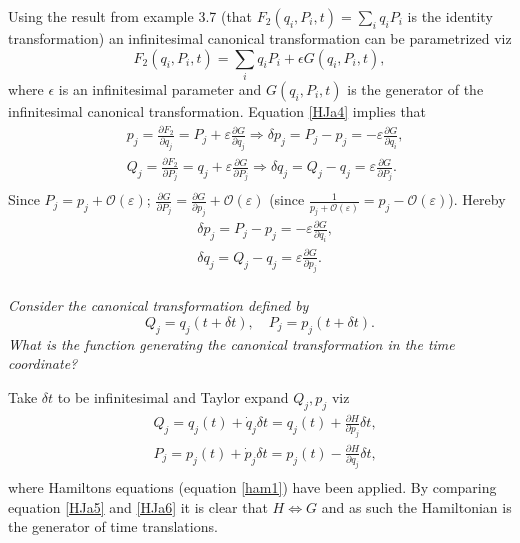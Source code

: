 Using the result from example 3.7 (that $F_2(q_i,P_i,t)=\sum_iq_iP_i$ is the identity transformation) an infinitesimal canonical transformation can be parametrized viz
\begin{equation}
	F_2(q_i,P_i,t)=\sum_iq_iP_i+\epsilon G(q_i,P_i,t),
	\label{HJa4}
\end{equation} 
where $\epsilon$ is an infinitesimal parameter and $G(q_i,P_i,t)$ is the generator of the infinitesimal canonical transformation. Equation \eqref{HJa4} implies that
\begin{equation}
	\begin{split}
		&p_j=\frac{\partial F_2}{\partial q_j}=P_j+\varepsilon \frac{\partial G}{\partial q_j}\Rightarrow \delta p_j=P_j-p_j=-\varepsilon \frac{\partial G}{\partial q_i},\\
		& Q_j=\frac{\partial F_2}{\partial P_j}=q_j+\varepsilon \frac{\partial G}{\partial P_j}\Rightarrow \delta q_j=Q_j-q_j=\varepsilon \frac{\partial G}{\partial P_j}.\\
	\end{split}
\end{equation} 
Since $P_j=p_j+\mathcal{O}(\varepsilon)$; $\frac{\partial G}{\partial P_j}=\frac{\partial G}{\partial p_j}+\mathcal{O}(\varepsilon)$ (since $\frac{1}{p_j+\mathcal{O}(\varepsilon)}=p_j-\mathcal{O}(\varepsilon)$). Hereby
\begin{equation}
	\begin{split}
		&\delta p_j=P_j-p_j=-\varepsilon \frac{\partial G}{\partial q_i},\\
		&\delta q_j=Q_j-q_j=\varepsilon \frac{\partial G}{\partial p_j}.\\
	\end{split}
	\label{HJa6}
\end{equation} 
\begin{example}
	\emph{Consider the canonical transformation defined by}
	\begin{equation}
		Q_j=q_j(t+\delta t), \quad P_j=p_j(t+\delta t).
	\end{equation} 
	\emph{What is the function generating the canonical transformation in the time coordinate?} \newline
	
	Take $\delta t$ to be infinitesimal and Taylor expand $Q_j,p_j$ viz
	\begin{equation}
		\begin{split}
			&Q_j=q_j(t)+\dot{q}_j\delta t=q_j(t)+\frac{\partial H}{\partial p_j}\delta t,\\
			&P_j=p_j(t)+\dot{p}_j\delta t=p_j(t)-\frac{\partial H}{\partial q_j}\delta t,\\
		\end{split}
		\label{HJa5}
	\end{equation} 
	where Hamiltons equations (equation \eqref{ham1}) have been applied. By comparing equation \eqref{HJa5} and \eqref{HJa6} it is clear that $H\Leftrightarrow G$ and as such the Hamiltonian is the generator of time translations.
\end{example}
